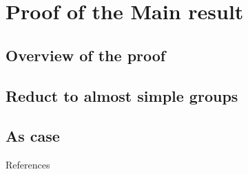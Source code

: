 \documentclass{beamer}
\begin{document}
\section{Proof of the Main result}
\subsection{Overview of the proof}
\subsection{Reduct to almost simple groups}
\subsection{As case}





\begin{frame}{References}
\small
\printbibliography
\end{frame}
\end{document}
